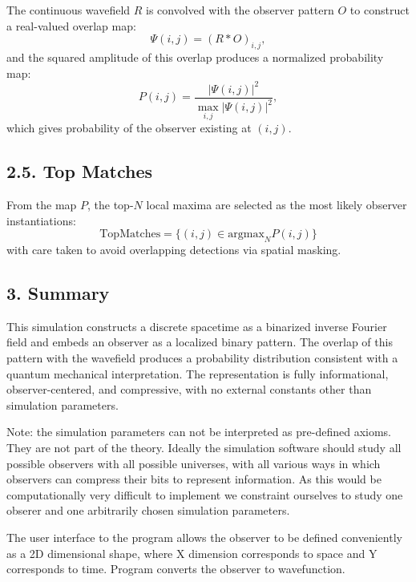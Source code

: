 \documentclass[11pt]{article}
\begin{document}
The continuous wavefield $R$ is convolved with the observer pattern $O$ to construct a real-valued overlap map:
\begin{equation}
    \Psi(i,j) = (R \ast O)_{i,j},
\end{equation}
and the squared amplitude of this overlap produces a normalized probability map:
\begin{equation}
    P(i,j) = \frac{|\Psi(i,j)|^2}{\max_{i,j} |\Psi(i,j)|^2},
\end{equation}
which gives probability of the observer existing at $(i,j)$.

\subsection*{2.5. Top Matches}

From the map $P$, the top-$N$ local maxima are selected as the most likely observer instantiations:
\[
    \text{TopMatches} = \{(i,j) \in \text{argmax}_N P(i,j)\}
\]
with care taken to avoid overlapping detections via spatial masking.

\subsection*{3. Summary}

This simulation constructs a discrete spacetime as a binarized inverse Fourier field and embeds an observer as a localized binary pattern. The overlap of this pattern with the wavefield produces a probability distribution consistent with a quantum mechanical interpretation. The representation is fully informational, observer-centered, and compressive, with no external constants other than simulation parameters.

Note: the simulation parameters can not be interpreted as pre-defined axioms. They are not part of the theory. Ideally the simulation software
should study all possible observers with all possible universes, with all various ways in which observers can compress their bits to represent  information.
As this would be computationally very difficult to implement we constraint ourselves to study one obserer and one arbitrarily chosen simulation parameters.

The user interface to the program allows the observer to be defined conveniently as a
2D dimensional shape, where X dimension corresponds to space and Y corresponds to time.
Program converts the observer to wavefunction.
\end{document}
